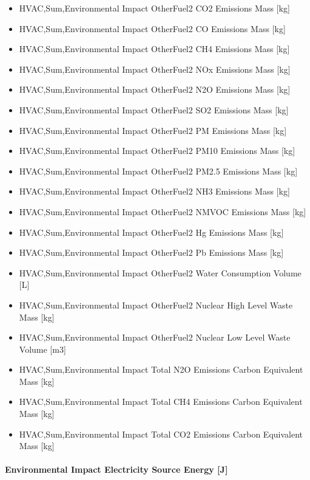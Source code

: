 \begin{itemize}
\item
  HVAC,Sum,Environmental Impact OtherFuel2 CO2 Emissions Mass {[}kg{]}
\item
  HVAC,Sum,Environmental Impact OtherFuel2 CO Emissions Mass {[}kg{]}
\item
  HVAC,Sum,Environmental Impact OtherFuel2 CH4 Emissions Mass {[}kg{]}
\item
  HVAC,Sum,Environmental Impact OtherFuel2 NOx Emissions Mass {[}kg{]}
\item
  HVAC,Sum,Environmental Impact OtherFuel2 N2O Emissions Mass {[}kg{]}
\item
  HVAC,Sum,Environmental Impact OtherFuel2 SO2 Emissions Mass {[}kg{]}
\item
  HVAC,Sum,Environmental Impact OtherFuel2 PM Emissions Mass {[}kg{]}
\item
  HVAC,Sum,Environmental Impact OtherFuel2 PM10 Emissions Mass {[}kg{]}
\item
  HVAC,Sum,Environmental Impact OtherFuel2 PM2.5 Emissions Mass {[}kg{]}
\item
  HVAC,Sum,Environmental Impact OtherFuel2 NH3 Emissions Mass {[}kg{]}
\item
  HVAC,Sum,Environmental Impact OtherFuel2 NMVOC Emissions Mass {[}kg{]}
\item
  HVAC,Sum,Environmental Impact OtherFuel2 Hg Emissions Mass {[}kg{]}
\item
  HVAC,Sum,Environmental Impact OtherFuel2 Pb Emissions Mass {[}kg{]}
\item
  HVAC,Sum,Environmental Impact OtherFuel2 Water Consumption Volume {[}L{]}
\item
  HVAC,Sum,Environmental Impact OtherFuel2 Nuclear High Level Waste Mass {[}kg{]}
\item
  HVAC,Sum,Environmental Impact OtherFuel2 Nuclear Low Level Waste Volume {[}m3{]}
\item
  HVAC,Sum,Environmental Impact Total N2O Emissions Carbon Equivalent Mass {[}kg{]}
\item
  HVAC,Sum,Environmental Impact Total CH4 Emissions Carbon Equivalent Mass {[}kg{]}
\item
  HVAC,Sum,Environmental Impact Total CO2 Emissions Carbon Equivalent Mass {[}kg{]}
\end{itemize}

\paragraph{Environmental Impact Electricity Source Energy {[}J{]}}\label{environmental-impact-electricity-source-energy-j}

